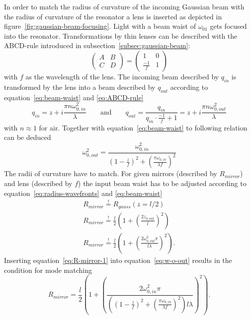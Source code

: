 In order to match the radius of curvature of the incoming Gaussian beam with the radius of curvature of the resonator a lens is inserted as depicted in figure~\ref{fig:gaussian-beam-focusing}. Light with a beam waist of $\omega_{01}$ gets focused into the resonator. Transformations by thin lenses can be described with the ABCD-rule introduced in subsection~\ref{subsec:gaussian-beam}:
\begin{equation}
\begin{pmatrix}
A & B \\
C & D
\end{pmatrix}
=
\begin{pmatrix}
1 & 0 \\
\frac{-1}{f} & 1
\end{pmatrix}
\end{equation}
with $f$ as the wavelength of the lens.
The incoming beam described by $q_{in}$ is transformed by the lens into a beam described by $q_{out}$ according to equation~\eqref{eq:beam-waist} and \eqref{eq:ABCD-rule}
\begin{equation}
q_{in} = z + i \frac{\pi n \omega_{0,in}^2}{\lambda} \qquad \mathrm{and} \qquad
q_{out} = \frac{q_{in}}{q_{in} \cdot \frac{-1}{f} + 1} =  z + i \frac{\pi n \omega_{0,out}^2}{\lambda}
\end{equation}
with $n\approx 1$ for air. Together with equation~\eqref{eq:beam-waist} to following relation can be deduced
\begin{equation}
\label{eq:w-o-out}
\omega_{0,out}^2 = \frac{\omega_{0,in}^2}{\left(1-\frac{z}{f}\right)^2+\left(\frac{\pi \omega_{0,in}}{\lambda f}\right)^2}
\end{equation}
The radii of curvature have to match.
For given mirrors (described by $R_{mirror}$) and lens (described by $f$) the input beam waist has to be adjusted according to equation~\eqref{eq:radius-wavefronts} and \eqref{eq:beam-waist} 
\begin{align}
R_{mirror} \stackrel{!}{=} R_{gauss}(z= l/2)\\
R_{mirror} \stackrel{!}{=} \frac{l}{2} \left(1+\left(\frac{2z_{0,out}}{l}\right)^2\right) \\
\label{eq:R-mirror-1}
R_{mirror} \stackrel{!}{=} \frac{l}{2} \left(1+\left(\frac{2\omega_{0,out}^2 \pi}{l \lambda}\right)^2\right).
\end{align}
Inserting equation~\eqref{eq:R-mirror-1} into equation~\eqref{eq:w-o-out} results in the condition for mode matching
\begin{equation}
\label{eq:R-mirror-2}
R_{mirror} = \frac{l}{2} \left(1+\left(\frac{2 \omega_{0,in}^2 \pi}{\left(\left(1-\frac{z}{f}\right)^2+\left(\frac{\pi \omega_{0,in}}{\lambda f}\right)^2\right)l \lambda}\right)^2\right).
\end{equation}

